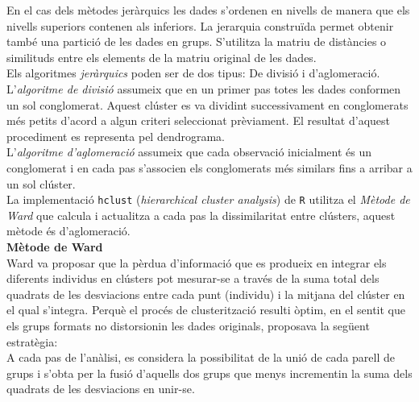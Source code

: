 \documentclass[english]{article}
\begin{document}
En el cas dels mètodes jeràrquics les dades s'ordenen en nivells de manera que els nivells superiors contenen als inferiors. La jerarquia construïda permet obtenir també una partició de les dades en grups. S'utilitza la matriu de distàncies o similituds entre els elements de la matriu original de les dades.
\\

Els algoritmes \textit{jeràrquics} poden ser de dos tipus: De divisió i d'aglomeració.
\\

L'\textit{algoritme de divisió} assumeix que en un primer pas totes les dades conformen un sol conglomerat. Aquest clúster es va dividint successivament en conglomerats més petits d'acord a algun criteri seleccionat prèviament. El resultat d'aquest procediment es representa pel dendrograma.
\\

L'\textit{algoritme d'aglomeració} assumeix que cada observació inicialment és un conglomerat i en cada pas s'associen els conglomerats més similars fins a arribar a un sol clúster.
\\

La implementació \texttt{hclust} (\textit{hierarchical cluster analysis}) de \texttt{R} utilitza el \textit{Mètode de Ward} que calcula i actualitza a cada pas la dissimilaritat entre clústers, aquest mètode és d'aglomeració.
\\
\clearpage
\noindent\textbf{Mètode de Ward}
\\

\noindent Ward va proposar que la pèrdua d'informació que es produeix en integrar els diferents individus en clústers pot mesurar-se a través de la suma total dels quadrats de les desviacions entre cada punt (individu) i la mitjana del clúster en el qual s'integra. Perquè el procés de clusterització resulti òptim, en el sentit que els grups formats no distorsionin les dades originals, proposava la següent estratègia:
\\

A cada pas de l'anàlisi, es considera la possibilitat de la unió de cada parell de grups i s'obta per la fusió d'aquells dos grups que menys incrementin la suma dels quadrats de les desviacions en unir-se.
\\
\end{document}
